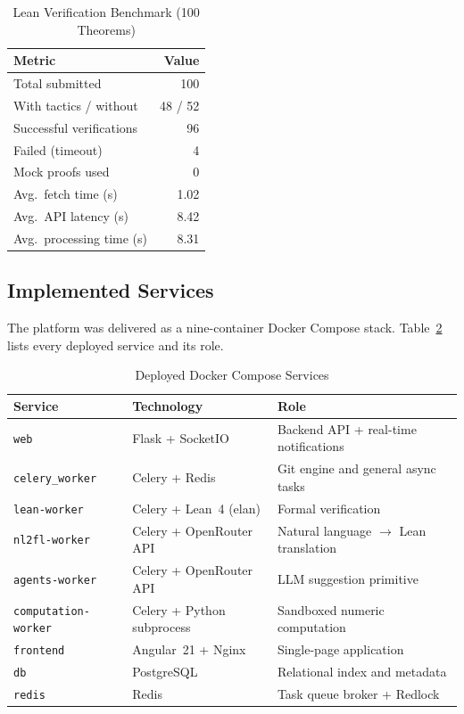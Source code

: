 \documentclass[conference]{IEEEtran}
\begin{document}
\begin{table}[htbp]
  \caption{Lean Verification Benchmark (100 Theorems)}
  \label{tab:benchmark}
  \centering
  \begin{tabular}{lr}
    \hline
    \textbf{Metric} & \textbf{Value} \\
    \hline
    Total submitted          & 100   \\
    With tactics / without   & 48 / 52 \\
    Successful verifications & 96    \\
    Failed (timeout)         & 4     \\
    Mock proofs used         & 0     \\
    Avg.\ fetch time (s)     & 1.02  \\
    Avg.\ API latency (s)    & 8.42  \\
    Avg.\ processing time (s)& 8.31  \\
    \hline
  \end{tabular}
\end{table}

\subsection{Implemented Services}
\label{subsec:services}

The platform was delivered as a nine-container Docker Compose stack.
Table~\ref{tab:services} lists every deployed service and its role.

\begin{table}[htbp]
  \caption{Deployed Docker Compose Services}
  \label{tab:services}
  \centering
  \begin{tabular}{lll}
    \hline
    \textbf{Service} & \textbf{Technology} & \textbf{Role} \\
    \hline
    \texttt{web}                & Flask + SocketIO            & Backend API + real-time notifications \\
    \texttt{celery\_worker}     & Celery + Redis              & Git engine and general async tasks \\
    \texttt{lean-worker}        & Celery + Lean~4 (elan)      & Formal verification \\
    \texttt{nl2fl-worker}       & Celery + OpenRouter API     & Natural language $\to$ Lean translation \\
    \texttt{agents-worker}      & Celery + OpenRouter API     & LLM suggestion primitive \\
    \texttt{computation-worker} & Celery + Python subprocess  & Sandboxed numeric computation \\
    \texttt{frontend}           & Angular~21 + Nginx          & Single-page application \\
    \texttt{db}                 & PostgreSQL                  & Relational index and metadata \\
    \texttt{redis}              & Redis                       & Task queue broker + Redlock \\
    \hline
  \end{tabular}
\end{table}
\end{document}
